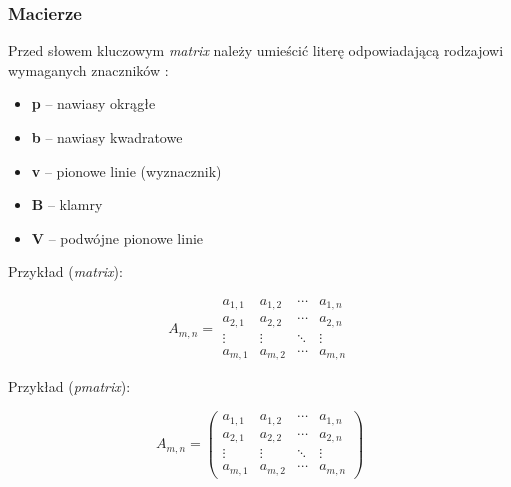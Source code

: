 \subsubsection{Macierze}

Przed słowem kluczowym \textit{matrix} należy umieścić literę odpowiadającą rodzajowi wymaganych znaczników \cite{noauthor_how_nodate}:
\begin{itemize}
	\item \textbf{p} -- nawiasy okrągłe
	\item \textbf{b} -- nawiasy kwadratowe
	\item \textbf{v} -- pionowe linie (wyznacznik)
	\item \textbf{B} -- klamry
	\item \textbf{V} -- podwójne pionowe linie
\end{itemize}


Przykład (\textit{matrix}):

\begin{equation}
A_{m,n} = 
\begin{matrix}
a_{1,1} & a_{1,2} & \cdots & a_{1,n} \\
a_{2,1} & a_{2,2} & \cdots & a_{2,n} \\
\vdots  & \vdots  & \ddots & \vdots  \\
a_{m,1} & a_{m,2} & \cdots & a_{m,n} 
\end{matrix}
\end{equation}


Przykład (\textit{pmatrix}):

\begin{equation}
A_{m,n} = 
\begin{pmatrix}
a_{1,1} & a_{1,2} & \cdots & a_{1,n} \\
a_{2,1} & a_{2,2} & \cdots & a_{2,n} \\
\vdots  & \vdots  & \ddots & \vdots  \\
a_{m,1} & a_{m,2} & \cdots & a_{m,n} 
\end{pmatrix}
\end{equation}


